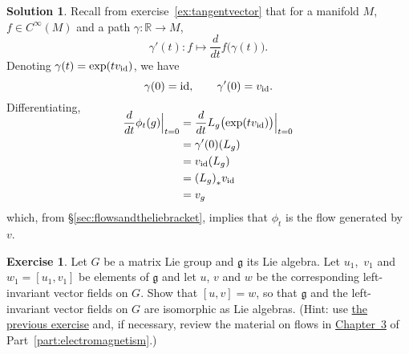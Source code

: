 \documentclass[11pt, a4paper]{report}
\theoremstyle{definition}
\newtheorem{exercise}{Exercise}[part]
\newtheorem{solution}{Solution}[part]
\newenvironment{ex}{\begin{exercise}}{\end{exercise}\pagebreak[1]}
\newenvironment{sol}{\begin{solution}}{\end{solution}\pagebreak[3]}
\newcommand*{\op}[1]{\ensuremath\mathop{}\mathopen{}#1}
\newcommand*{\id}{\op{\mathrm{id}}}
\begin{document}
\begin{sol}

Recall from exercise~\ref{ex:tangentvector} that for a manifold $M$, $f \in C^\infty(M)$ and a path $\gamma: \mathbb{R} \to M$,
\[
    \gamma'(t): f \mapsto \frac{d}{dt} f\bigl(\gamma(t)\bigr).
\]
Denoting $\gamma(t) = \exp(tv_{\id})$, we have
\[
    \gamma(0) = \id, \qquad
    \gamma'(0) = v_{\id}.
\]
Differentiating,
\begin{align*}
    \SwapAboveDisplaySkip
    \frac{d}{dt} \phi_t(g) \Big|_{t = 0} &= \frac{d}{dt} L_g\bigl(\exp(tv_{\id}) \bigr) \Big|_{t = 0} \\
        &= \gamma'(0) (L_g) \\
        &= v_{\id}(L_g) \\
        &= {(L_g)}_* v_{\id} \\
        &= v_g
\end{align*}
which, from \S\ref{sec:flowsandtheliebracket}, implies that $\phi_t$ is the flow generated by $v$.

\end{sol}

\begin{ex}

Let $G$ be a matrix Lie group and $\mathfrak{g}$ its Lie algebra.
Let $u_1$,~$v_1$ and $w_1 = [u_1, v_1]$ be elements of $\mathfrak{g}$ and let $u$, $v$ and $w$ be the corresponding left-invariant vector fields on $G$.
Show that $[u, v] = w$, so that $\mathfrak{g}$ and the left-invariant vector fields on $G$ are isomorphic as Lie algebras.
(Hint: use \hyperref[ex:liealgebraflow]{the previous exercise} and, if necessary, review the material on flows in \hyperref[ch:vectorfields]{Chapter~3} of Part~\ref{part:electromagnetism}.)

\end{ex}
\end{document}
